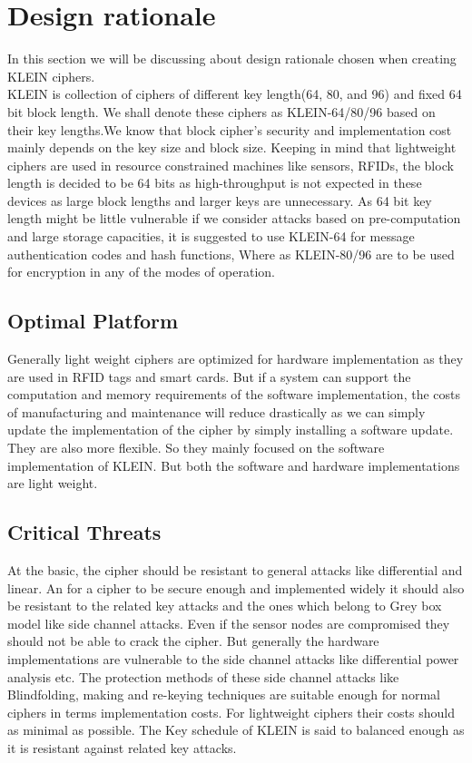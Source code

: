 \documentclass[preprint]{transcrypto}
\begin{document}
\section{Design rationale}
In this section we will be discussing about design rationale chosen when creating KLEIN ciphers.
\\
KLEIN is collection of ciphers of different key length(64, 80, and 96) and fixed 64 bit block length.
We shall denote these ciphers as KLEIN-64/80/96 based on their key lengths.We know that block cipher's security and implementation cost mainly depends on the key size and block size. Keeping in mind that lightweight ciphers are used in resource constrained machines like sensors, RFIDs, the block length is decided to be 64 bits as high-throughput is not expected in these devices as large block lengths and larger keys are unnecessary. As 64 bit key length might be little vulnerable if we consider attacks based on pre-computation and large storage capacities, it is suggested to use KLEIN-64 for message authentication codes and hash functions, Where as KLEIN-80/96 are to be used for encryption in any of the modes of operation.

\subsection{Optimal Platform} Generally light weight ciphers are optimized for hardware implementation as they are used in RFID tags and smart cards. But if a system can support the computation and memory requirements of the software implementation, the costs of manufacturing and maintenance will reduce drastically as we can simply update the implementation of the cipher by simply installing a software update. They are also more flexible. So they mainly focused on the software implementation of KLEIN. 
But both the software and hardware implementations are light weight.
\subsection{Critical Threats}
At the basic, the cipher should be resistant to general attacks like differential and linear. An for a cipher to be secure enough and implemented widely it should also be resistant to the related key attacks and the ones which belong to Grey box model like side channel attacks. Even if the sensor nodes are compromised they should not be able to crack the cipher. But generally the hardware implementations are vulnerable to the side channel attacks like differential power analysis etc. The protection methods of these side channel attacks like Blindfolding, making and re-keying techniques are suitable enough for normal ciphers in terms implementation costs. For lightweight ciphers their costs should as minimal as possible. The Key schedule of KLEIN is said to balanced enough as it is resistant against related key attacks. 
\end{document}
